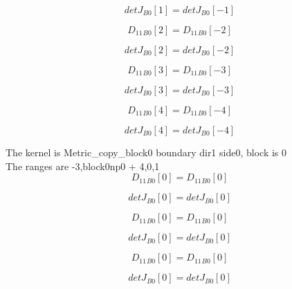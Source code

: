 \documentclass{article}
\begin{document}
\begin{dmath}{detJ{_{B0}}}[{1}] = {detJ{_{B0}}}[{-1}]\end{dmath}

\begin{dmath}{D_{11}{_{B0}}}[{2}] = {D_{11}{_{B0}}}[{-2}]\end{dmath}

\begin{dmath}{detJ{_{B0}}}[{2}] = {detJ{_{B0}}}[{-2}]\end{dmath}

\begin{dmath}{D_{11}{_{B0}}}[{3}] = {D_{11}{_{B0}}}[{-3}]\end{dmath}

\begin{dmath}{detJ{_{B0}}}[{3}] = {detJ{_{B0}}}[{-3}]\end{dmath}

\begin{dmath}{D_{11}{_{B0}}}[{4}] = {D_{11}{_{B0}}}[{-4}]\end{dmath}

\begin{dmath}{detJ{_{B0}}}[{4}] = {detJ{_{B0}}}[{-4}]\end{dmath}

\noindent The kernel is Metric_copy_block0 boundary dir1 side0, block is 0\\\noindent The ranges are -3,block0np0 + 4,0,1\\\begin{dmath}{D_{11}{_{B0}}}[{0}] = {D_{11}{_{B0}}}[{0}]\end{dmath}

\begin{dmath}{detJ{_{B0}}}[{0}] = {detJ{_{B0}}}[{0}]\end{dmath}

\begin{dmath}{D_{11}{_{B0}}}[{0}] = {D_{11}{_{B0}}}[{0}]\end{dmath}

\begin{dmath}{detJ{_{B0}}}[{0}] = {detJ{_{B0}}}[{0}]\end{dmath}

\begin{dmath}{D_{11}{_{B0}}}[{0}] = {D_{11}{_{B0}}}[{0}]\end{dmath}

\begin{dmath}{detJ{_{B0}}}[{0}] = {detJ{_{B0}}}[{0}]\end{dmath}
\end{document}

